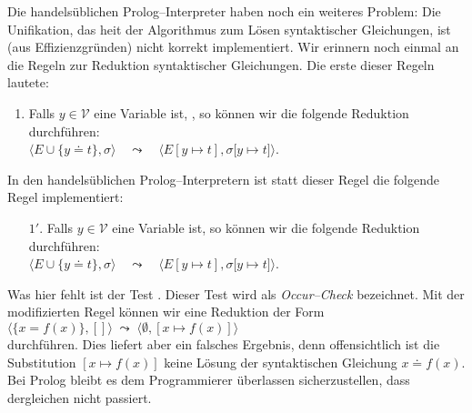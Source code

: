 Die handels\"{u}blichen Prolog--Interpreter haben noch ein weiteres Problem: Die Unifikation,
das hei\3t der Algorithmus zum L\"{o}sen syntaktischer Gleichungen, ist (aus Effizienzgr\"{u}nden)
nicht korrekt implementiert.  Wir erinnern noch einmal an die Regeln zur Reduktion
syntaktischer Gleichungen.  Die erste dieser Regeln lautete:
\begin{enumerate}
\item Falls $y\in\mathcal{V}$ eine Variable ist, , so
      k\"{o}nnen wir die folgende Reduktion durchf\"{u}hren: \\[0.1cm]
      \hspace*{2.1cm} $\Big\langle E \cup \big\{ y \doteq t \big\}, \sigma \Big\rangle \quad\leadsto\quad \Big\langle E[y \mapsto t], \sigma\big[ y \mapsto t \big] \Big\rangle$.
\end{enumerate}
In den handels\"{u}blichen Prolog--Interpretern ist statt dieser Regel die folgende Regel
implementiert:
\begin{enumerate}
\item[$1'$.] Falls $y\in\mathcal{V}$ eine Variable ist, so
      k\"{o}nnen wir die folgende Reduktion durchf\"{u}hren: \\[0.1cm]
      \hspace*{2.1cm} $\Big\langle E \cup \big\{ y \doteq t \big\}, \sigma \Big\rangle \quad\leadsto\quad \Big\langle E[y \mapsto t], \sigma\big[ y \mapsto t \big] \Big\rangle$.
\end{enumerate}
Was hier fehlt ist der Test .  Dieser Test
wird als \emph{Occur--Check} bezeichnet.  Mit der modifizierten Regel k\"{o}nnen wir eine
Reduktion der Form
\\[0.1cm]
\hspace*{1.3cm} $\langle \{ x = f(x) \}, [] \rangle \;\leadsto\; \langle \emptyset, [ x \mapsto f(x) ] \rangle$ \\[0.1cm]
durchf\"{u}hren.  Dies liefert aber ein falsches Ergebnis, denn offensichtlich ist die Substitution 
$[x \mapsto f(x)]$ keine L\"{o}sung der syntaktischen Gleichung $x \doteq f(x)$.  
Bei Prolog bleibt es dem Programmierer \"{u}berlassen sicherzustellen, dass dergleichen nicht 
passiert.

